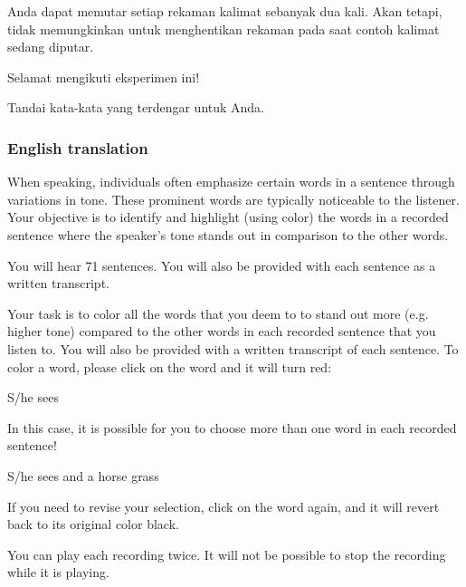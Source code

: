 Anda dapat memutar setiap rekaman kalimat sebanyak dua kali. Akan tetapi, tidak memungkinkan untuk menghentikan rekaman pada saat contoh kalimat sedang diputar.\newline

Selamat mengikuti eksperimen ini!\newline

Tandai kata-kata yang terdengar    untuk Anda.



\subsubsection{English translation}
\label{Instructions_p_ENG}


When speaking, individuals often emphasize certain words in a sentence through variations in tone. These prominent words are typically noticeable to the listener. Your objective is to identify and highlight (using color) the words in a recorded sentence where the speaker's tone stands out in comparison to the other words. \newline

You will hear 71 sentences. You will also be provided with each sentence as a written transcript.\newline

Your task is to color all the words that you deem to to stand out more (e.g. higher tone) compared to the other words in each recorded sentence that you listen to. You will also be provided with a written transcript of each sentence. To color a word, please click on the word and it will turn red: \newline

\begin{center}
	S/he sees 
\end{center}

In this case, it is possible for you to choose more than one word in each recorded sentence!

\begin{center}
	S/he sees  and a horse  grass
	
\end{center}
If you need to revise your selection, click on the word again, and it will revert back to its original color black.\newline

You can play each recording twice. It will not be possible to stop the recording while it is playing.\newline

